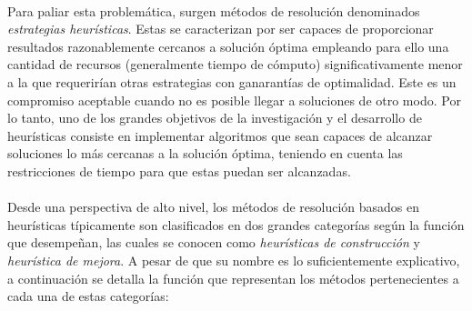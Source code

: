 \documentclass{subfiles}
\begin{document}
      \paragraph{}
      Para paliar esta problemática, surgen métodos de resolución denominados \emph{estrategias heurísticas}. Estas se caracterizan por ser capaces de proporcionar resultados razonablemente cercanos a solución óptima empleando para ello una cantidad de recursos (generalmente tiempo de cómputo) significativamente menor a la que requerirían otras estrategias con ganarantías de optimalidad. Este es un compromiso aceptable cuando no es posible llegar a soluciones de otro modo. Por lo tanto, uno de los grandes objetivos de la investigación y el desarrollo de heurísticas consiste en implementar algoritmos que sean capaces de alcanzar soluciones lo más cercanas a la solución óptima, teniendo en cuenta las restricciones de tiempo para que estas puedan ser alcanzadas.

      \paragraph{}
      Desde una perspectiva de alto nivel, los métodos de resolución basados en heurísticas típicamente son clasificados en dos grandes categorías según la función que desempeñan, las cuales se conocen como \emph{heurísticas de construcción} y \emph{heurística de mejora}. A pesar de que su nombre es lo suficientemente explicativo, a continuación se detalla la función que representan los métodos pertenecientes a cada una de estas categorías:
\end{document}
